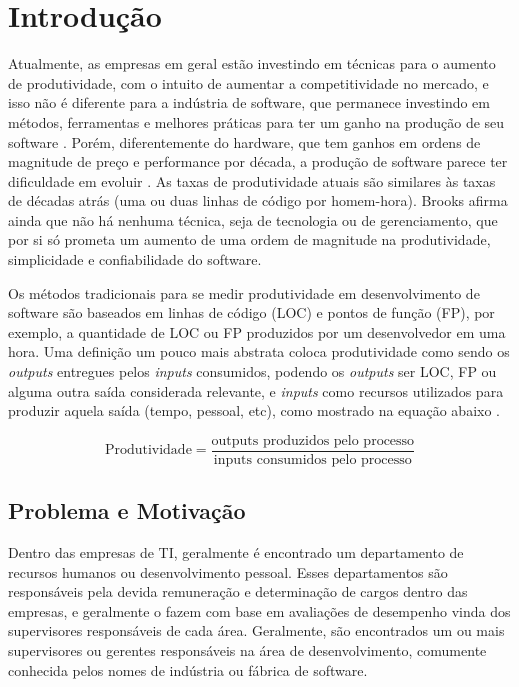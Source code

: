 \chapter[Introdução]{Introdução}

Atualmente, as empresas em geral estão investindo em técnicas para o aumento de produtividade, com o intuito de aumentar a competitividade no mercado, e isso não é diferente para a indústria de software, que permanece investindo em métodos, ferramentas e melhores práticas para ter um ganho na produção de seu software \cite{deBarrosSampaio2010}.
Porém, diferentemente do hardware, que tem ganhos em ordens de magnitude de preço e performance por década, a produção de software parece ter dificuldade em evoluir \cite{Boehm1987}. As taxas de produtividade atuais são similares às taxas de décadas atrás (uma ou duas linhas de código por homem-hora)\cite{Boehm1987}. Brooks \cite{BrooksJr1987} afirma ainda que não há nenhuma técnica, seja de tecnologia ou de gerenciamento, que por si só prometa um aumento de uma ordem de magnitude na produtividade, simplicidade e confiabilidade do software.

Os métodos tradicionais para se medir produtividade em desenvolvimento de software são baseados em linhas de código (\acs{LOC}) e pontos de função (\acs{FP})\cite{Wagner2008}, por exemplo, a quantidade de LOC ou FP produzidos por um desenvolvedor em uma hora. Uma definição um pouco mais abstrata coloca produtividade como sendo os \textit{outputs} entregues pelos \textit{inputs} consumidos, podendo os \textit{outputs} ser LOC, FP ou alguma outra saída considerada relevante, e \textit{inputs} como recursos utilizados para produzir aquela saída (tempo, pessoal, etc), como mostrado na equação abaixo \cite{Walston1977, Boehm1987, Yu1991}.

\begin{equation}
\text{Produtividade} = \dfrac{\text{outputs produzidos pelo processo}}{\text{inputs consumidos pelo processo}}
\end{equation} 

\section{Problema e Motivação}\label{secao1.2}
Dentro das empresas de TI, geralmente é encontrado um departamento de recursos humanos ou desenvolvimento pessoal. Esses departamentos são responsáveis pela devida remuneração e determinação de cargos dentro das empresas, e geralmente o fazem com base em avaliações de desempenho vinda dos supervisores responsáveis de cada área. Geralmente, são encontrados um ou mais supervisores ou gerentes responsáveis na área de desenvolvimento, comumente conhecida pelos nomes de indústria ou fábrica de software.

